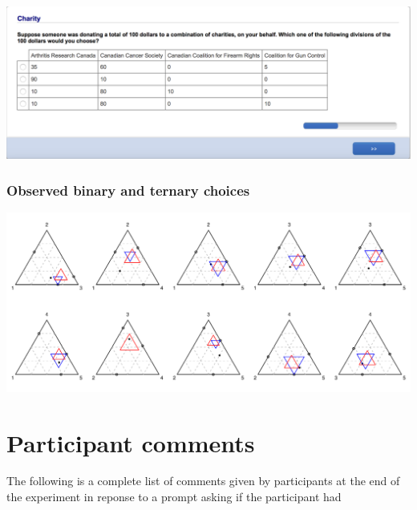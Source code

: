 \documentclass[11pt,letter]{article}
\begin{document}
\includegraphics[width=15cm]{Population_study_design/screenshot_Charity.png}

\subsubsection*{Observed binary and ternary choices}

\includegraphics[width=15cm]{./Population_study_data/Simplexes/Charity.pdf}

\pagebreak

\section{Participant comments}

The following is a complete list of comments given by participants at the end of the experiment in reponse to a prompt asking if the participant had 

\begin{small}

\end{small}




\end{document}
